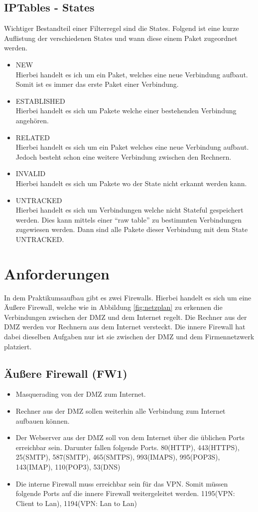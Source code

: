 \subsection{IPTables - States}
Wichtiger Bestandteil einer Filterregel sind die States. Folgend ist eine kurze Auflistung der verschiedenen States und wann diese einem Paket zugeordnet werden.
\begin{itemize} 
	\item NEW \\
	Hierbei handelt es ich um ein Paket, welches eine neue Verbindung aufbaut. Somit ist es immer das erste Paket einer Verbindung.
	\item ESTABLISHED \\
	Hierbei handelt es sich um Pakete welche einer bestehenden Verbindung angehören.
	\item RELATED \\
	Hierbei handelt es sich um ein Paket welches eine neue Verbindung aufbaut. Jedoch besteht schon eine weitere Verbindung zwischen den Rechnern.
	\item INVALID \\
	Hierbei handelt es sich um Pakete wo der State nicht erkannt werden kann.
	\item UNTRACKED \\
	Hierbei handelt es sich um Verbindungen welche nicht Stateful gespeichert werden. Dies kann mittels einer "`raw table"' zu bestimmten Verbindungen zugewiesen werden. Dann sind alle Pakete dieser Verbindung mit dem State UNTRACKED.
\end{itemize} 

\section{Anforderungen}
In dem Praktikumsaufbau gibt es zwei Firewalls. Hierbei handelt es sich um eine Äußere Firewall, welche wie in Abbildung \ref{fig:netzplan} zu erkennen die Verbindungen zwischen der DMZ und dem Internet regelt. Die Rechner aus der DMZ werden vor Rechnern aus dem Internet versteckt. Die innere Firewall hat dabei dieselben Aufgaben nur ist sie zwischen der DMZ und dem Firmennetzwerk platziert.

\subsection{Äußere Firewall (FW1)}
\begin{itemize}
\item Masquerading von der DMZ zum Internet.
\item Rechner aus der DMZ sollen weiterhin alle Verbindung zum Internet aufbauen können.
\item Der Webserver aus der DMZ soll von dem Internet über die üblichen Ports erreichbar sein. Darunter fallen folgende Ports. 80(HTTP), 443(HTTPS), 25(SMTP), 587(SMTP), 465(SMTPS), 993(IMAPS), 995(POP3S), 143(IMAP), 110(POP3), 53(DNS)
\item Die interne Firewall muss erreichbar sein für das VPN. Somit müssen folgende Ports auf die innere Firewall weitergeleitet werden. 1195(VPN: Client to Lan), 1194(VPN: Lan to Lan)
\end{itemize}

